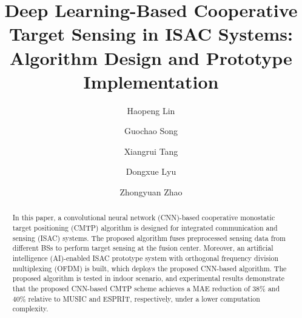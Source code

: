 \documentclass[sigconf]{acmart}
\begin{document}
\title[DL-Based ISAC Cooperative Sensing]{Deep Learning-Based Cooperative Target Sensing in ISAC Systems: Algorithm Design and Prototype Implementation}

\author{Haopeng Lin}

\author{Guochao Song}

\author{Xiangrui Tang}

\author{Dongxue Lyu}

\author{Zhongyuan Zhao}
\correspondingauthor
{}

\renewcommand{\shortauthors}{Haopeng Lin et al.}

\begin{abstract}
In this paper, a convolutional neural network (CNN)-based cooperative monostatic target positioning (CMTP) algorithm is designed for integrated communication and sensing (ISAC) systems. The proposed algorithm fuses preprocessed sensing data from different BSs to perform target sensing at the fusion center. Moreover, an artificial intelligence (AI)-enabled ISAC prototype system with orthogonal frequency division multiplexing (OFDM) is built, which deploys the proposed CNN-based algorithm. The proposed algorithm is tested in indoor scenario, and experimental results demonstrate that the proposed CNN-based CMTP scheme achieves a MAE reduction of $38\%$ and $40\%$ relative to MUSIC and ESPRIT, respectively, under a lower computation complexity.
\end{abstract}
\end{document}
